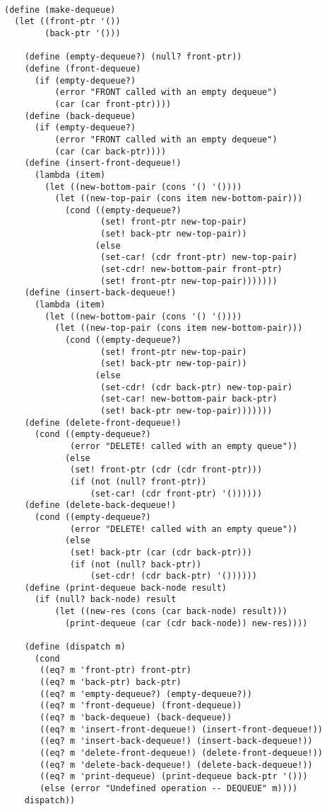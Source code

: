 \documentclass[10pt,a4paper]{article}
\begin{document}
\begin{lstlisting}

(define (make-dequeue)
  (let ((front-ptr '())
        (back-ptr '()))

    (define (empty-dequeue?) (null? front-ptr))
    (define (front-dequeue)
      (if (empty-dequeue?)
          (error "FRONT called with an empty dequeue")
          (car (car front-ptr))))
    (define (back-dequeue)
      (if (empty-dequeue?)
          (error "FRONT called with an empty dequeue")
          (car (car back-ptr))))
    (define (insert-front-dequeue!)
      (lambda (item)
        (let ((new-bottom-pair (cons '() '())))
          (let ((new-top-pair (cons item new-bottom-pair)))
            (cond ((empty-dequeue?)
                   (set! front-ptr new-top-pair)
                   (set! back-ptr new-top-pair))
                  (else
                   (set-car! (cdr front-ptr) new-top-pair)
                   (set-cdr! new-bottom-pair front-ptr)
                   (set! front-ptr new-top-pair)))))))
    (define (insert-back-dequeue!)
      (lambda (item)
        (let ((new-bottom-pair (cons '() '())))
          (let ((new-top-pair (cons item new-bottom-pair)))
            (cond ((empty-dequeue?)
                   (set! front-ptr new-top-pair)
                   (set! back-ptr new-top-pair))
                  (else
                   (set-cdr! (cdr back-ptr) new-top-pair)
                   (set-car! new-bottom-pair back-ptr)
                   (set! back-ptr new-top-pair)))))))
    (define (delete-front-dequeue!)
      (cond ((empty-dequeue?)
             (error "DELETE! called with an empty queue"))
            (else
             (set! front-ptr (cdr (cdr front-ptr)))
             (if (not (null? front-ptr))
                 (set-car! (cdr front-ptr) '())))))
    (define (delete-back-dequeue!)
      (cond ((empty-dequeue?)
             (error "DELETE! called with an empty queue"))
            (else
             (set! back-ptr (car (cdr back-ptr)))
             (if (not (null? back-ptr))
                 (set-cdr! (cdr back-ptr) '())))))
    (define (print-dequeue back-node result)
      (if (null? back-node) result
          (let ((new-res (cons (car back-node) result)))
            (print-dequeue (car (cdr back-node)) new-res))))

    (define (dispatch m)
      (cond
       ((eq? m 'front-ptr) front-ptr)
       ((eq? m 'back-ptr) back-ptr)
       ((eq? m 'empty-dequeue?) (empty-dequeue?))
       ((eq? m 'front-dequeue) (front-dequeue))
       ((eq? m 'back-dequeue) (back-dequeue))
       ((eq? m 'insert-front-dequeue!) (insert-front-dequeue!))
       ((eq? m 'insert-back-dequeue!) (insert-back-dequeue!))
       ((eq? m 'delete-front-dequeue!) (delete-front-dequeue!))
       ((eq? m 'delete-back-dequeue!) (delete-back-dequeue!))
       ((eq? m 'print-dequeue) (print-dequeue back-ptr '()))
       (else (error "Undefined operation -- DEQUEUE" m))))
    dispatch))


\end{lstlisting}
\end{document}
